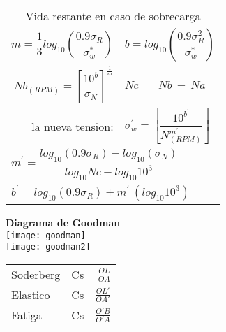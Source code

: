 \documentclass[11pt,a4paper]{article}
\begin{document}
\begin{multicols}{2}
\begin{cajita}
	\begin{tabular}{r l }
		\multicolumn{2}{c}{Vida restante en caso de sobrecarga}\\[0.2cm]
		$m=\dfrac{1}{3}log_{10}\left(\dfrac{0.9\sigma_{R}}{\sigma_{w}^{*}}\right)$&
		$b=log_{10}\left(\dfrac{0.9\sigma_{R}^{2}}{\sigma_{w}^{*}}\right)$\\[0.5cm]
		$Nb_{(RPM)}=\left[\dfrac{10^{b}}{\sigma_{N}}\right]^{\frac{1}{m}}$&$Nc~=~Nb~-~Na$\\
		la nueva tension: & $\sigma_{w}^{'}=\left[\dfrac{10^{b^{'}}}{N_{(RPM)}^{m^{'}}}\right]$\\[0.5cm]
		\multicolumn{2}{l}{$m^{'}=\dfrac{log_{10}(0.9\sigma_{R})-log_{10}(\sigma_{N})}{log_{10}Nc-log_{10}10^{3}}$}\\[0.3cm]
		\multicolumn{2}{l}{$b^{'}=log_{10}(0.9\sigma_{R})+m^{'}~(log_{10}10^{3})$}\\[0.25cm]
		
	\end{tabular}
\newpage
	\textbf{Diagrama de Goodman}\\
\texttt{[image: goodman]}\\
\texttt{[image: goodman2]}\\

\vspace*{0.2cm}
\begin{tabular}{l c r}	
	Soderberg&Cs&$\frac{OL}{OA}$\\[0.2cm]
	Elastico&Cs&$\frac{OL'}{OA'}$\\[0.2cm]
	Fatiga&Cs&$\frac{O'B}{O'A}$\\[0.2cm]
\end{tabular}
	\end{cajita}
	\end{multicols}
\end{document}
